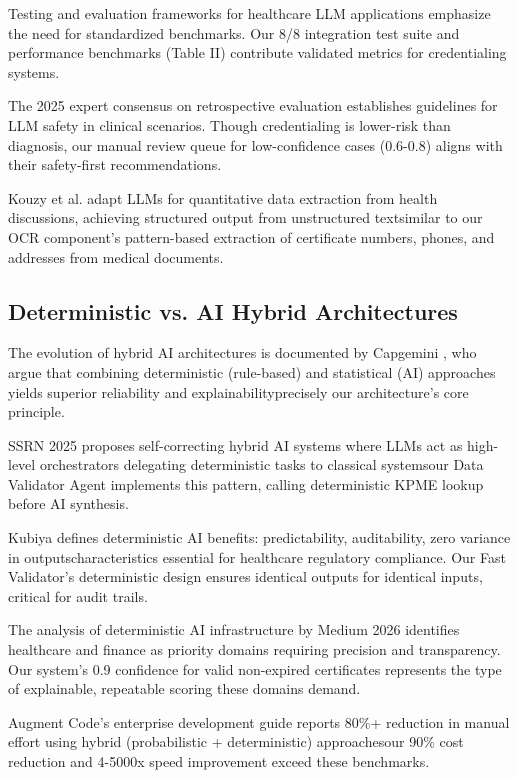 \documentclass[conference]{IEEEtran}
\begin{document}
Testing and evaluation frameworks for healthcare LLM applications \cite{pmc2024testing} emphasize the need for standardized benchmarks. Our 8/8 integration test suite and performance benchmarks (Table II) contribute validated metrics for credentialing systems.

The 2025 expert consensus on retrospective evaluation \cite{sciencedirect2025consensus} establishes guidelines for LLM safety in clinical scenarios. Though credentialing is lower-risk than diagnosis, our manual review queue for low-confidence cases (0.6-0.8) aligns with their safety-first recommendations.

Kouzy et al. \cite{kouzy2024quallm} adapt LLMs for quantitative data extraction from health discussions, achieving structured output from unstructured textsimilar to our OCR component's pattern-based extraction of certificate numbers, phones, and addresses from medical documents.

\subsection{Deterministic vs. AI Hybrid Architectures}

The evolution of hybrid AI architectures is documented by Capgemini \cite{capgemini2024hybrid}, who argue that combining deterministic (rule-based) and statistical (AI) approaches yields superior reliability and explainabilityprecisely our architecture's core principle.

SSRN 2025 \cite{ssrn2025selfcorrecting} proposes self-correcting hybrid AI systems where LLMs act as high-level orchestrators delegating deterministic tasks to classical systemsour Data Validator Agent implements this pattern, calling deterministic KPME lookup before AI synthesis.

Kubiya \cite{kubiya2024deterministic} defines deterministic AI benefits: predictability, auditability, zero variance in outputscharacteristics essential for healthcare regulatory compliance. Our Fast Validator's deterministic design ensures identical outputs for identical inputs, critical for audit trails.

The analysis of deterministic AI infrastructure by Medium 2026 \cite{medium2026deterministic} identifies healthcare and finance as priority domains requiring precision and transparency. Our system's 0.9 confidence for valid non-expired certificates represents the type of explainable, repeatable scoring these domains demand.

Augment Code's enterprise development guide \cite{augmentcode2024enterprise} reports 80\%+ reduction in manual effort using hybrid (probabilistic + deterministic) approachesour 90\% cost reduction and 4-5000x speed improvement exceed these benchmarks.
\end{document}
